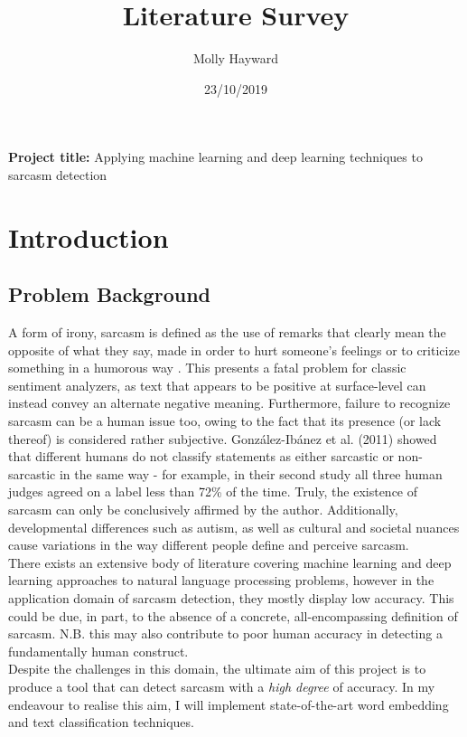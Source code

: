 \documentclass[12pt,a4paper]{article}
\title{Literature Survey}
\author{Molly Hayward}
\date{23/10/2019}
\begin{document}
\maketitle
\begin{center}
	\textbf{Project title:} Applying machine learning and deep learning techniques to sarcasm detection
\end{center}


\section{Introduction}
\subsection{Problem Background}
\noindent A form of irony, sarcasm is defined as the use of remarks that clearly mean the opposite of what they say, made in order to hurt someone's feelings or to criticize something in a humorous way \cite{cambridge2019}. This presents a fatal problem for classic sentiment analyzers, as text that appears to be positive at surface-level can instead convey an alternate negative meaning. Furthermore, failure to recognize sarcasm can be a human issue too, owing to the fact that its presence (or lack thereof) is considered rather subjective. Gonz{\'a}lez-Ib{\'a}nez et al. (2011) \cite{gonzalez2011identifying} showed that different humans do not classify statements as either sarcastic or non-sarcastic in the same way - for example, in their second study all three human judges agreed on a label less than 72\% of the time. Truly, the existence of sarcasm can only be conclusively affirmed by the author. Additionally, developmental differences such as autism, as well as cultural and societal nuances cause variations in the way different people define and perceive sarcasm. \\

\noindent There exists an extensive body of literature covering machine learning and deep learning approaches to natural language processing problems, however in the application domain of sarcasm detection, they mostly display low accuracy. This could be due, in part, to the absence of a concrete, all-encompassing definition of sarcasm. N.B. this may also contribute to poor human accuracy in detecting a fundamentally human construct. \\

\noindent Despite the challenges in this domain, the ultimate aim of this project is to produce a tool that can detect sarcasm with a \textit{high degree} of accuracy. In my endeavour to realise this aim, I will implement state-of-the-art word embedding and text classification techniques.
\end{document}
